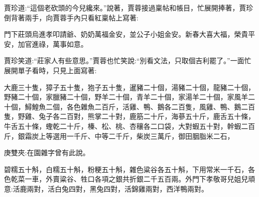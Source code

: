 \begin{parag}
    賈珍道:“這個老砍頭的今兒纔來。”說著，賈蓉接過稟帖和帳目，忙展開捧著，賈珍倒背著兩手，向賈蓉手內只看紅稟帖上寫著:
\end{parag}


\begin{qute2sp}
    門下莊頭烏進孝叩請爺、奶奶萬福金安，並公子小姐金安。新春大喜大福，榮貴平安，加官進祿，萬事如意。
\end{qute2sp}


\begin{parag}
    賈珍笑道:“莊家人有些意思。”賈蓉也忙笑說:“別看文法，只取個吉利罷了。”一面忙展開單子看時，只見上面寫著:
\end{parag}


\begin{qute2sp}
    大鹿三十隻，獐子五十隻，狍子五十隻，暹豬二十個，湯豬二十個，龍豬二十個，野豬二十個，家臘豬二十個，野羊二十個，青羊二十個，家湯羊二十個，家風羊二十個，鱘鰉魚二個，各色雜魚二百斤，活雞、鴨、鵝各二百隻，風雞、鴨、鵝二百隻，野雞、兔子各二百對，熊掌二十對，鹿筋二十斤，海蔘五十斤，鹿舌五十條，牛舌五十條，蟶乾二十斤，榛、松、桃、杏穰各二口袋，大對蝦五十對，幹蝦二百斤，銀霜炭上等選用一千斤、中等二千斤，柴炭三萬斤，御田胭脂米二石，\begin{note}庚雙夾:在園雜字曾有此說。\end{note}碧糯五十斛，白糯五十斛，粉粳五十斛，雜色粱谷各五十斛，下用常米一千石，各色乾菜一車，外賣粱谷、牲口各項之銀共折銀二千五百兩。外門下孝敬哥兒姐兒頑意:活鹿兩對，活白兔四對，黑兔四對，活錦雞兩對，西洋鴨兩對。
\end{qute2sp}


